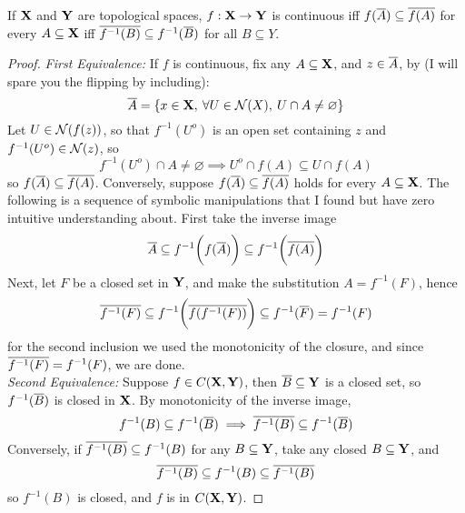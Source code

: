 \documentclass[../../main.tex]{subfiles}
\begin{document}
\begin{wts}
    If ${\mathbf{X}}$ and ${\mathbf{Y}}$ are topological spaces, $f: {\mathbf{X}}\to{\mathbf{Y}}$ is continuous iff $f(\overline{A})\subseteq\overline{f(A)}$ for every $A\subseteq {\mathbf{X}}$ iff $\overline{f^{-1}(B)}\subseteq f^{-1}(\overline{B})$ for all $B\subseteq Y$.
\end{wts}
\begin{proof}
    \emph{First Equivalence:} If $f$ is continuous, fix any $A\subseteq{\mathbf{X}}$, and $z\in \overline{A}$, by  (I will spare you the flipping by including):
    \[
    \overline{A} = \{x\in{\mathbf{X}},\: \forall U\in\mathcal{N}(X),\: U\cap A\neq\varnothing\}
    \]
    Let $U\in \mathcal{N}(f(z))$, so that $f^{-1}(U^o)$ is an open set containing $z$ and $f^{-1}(U^o)\in\mathcal{N}(z)$, so
    \[
        f^{-1}(U^o)\cap A\neq\varnothing\implies U^o\cap f(A)\subseteq U\cap f(A)
    \]
    so $f(\overline{A})\subseteq \overline{f(A)}$. Conversely, suppose $f(\overline{A})\subseteq\overline{f(A)}$ holds for every $A\subseteq{\mathbf{X}}$. The following is a sequence of symbolic manipulations that I found but have zero intuitive understanding about. First take the inverse image
    \[
        \overline{A}\subseteq f^{-1}\biggl(f(\overline{A})\biggr)\subseteq f^{-1}\biggl(\overline{f(A)}\biggr)
    \]
    Next, let $F$ be a closed set in ${\mathbf{Y}}$, and make the substitution $A = f^{-1}(F)$, hence
    \[
        \overline{f^{-1}(F)}\subseteq f^{-1}\biggl(\overline{f(f^{-1}(F))}\biggr)\subseteq f^{-1}(\overline{F})=f^{-1}(F)
    \]
    for the second inclusion we used the monotonicity of the closure, and since $\overline{f^{-1}(F)} = f^{-1}(F)$, we are done.
    \\

    \emph{Second Equivalence:} Suppose $f\in C({\mathbf{X}},{\mathbf{Y}})$, then $\overline{B}\subseteq {\mathbf{Y}}$ is a closed set, so $f^{-1}(\overline{B})$ is closed in ${\mathbf{X}}$. By monotonicity of the inverse image,
    \[
        f^{-1}(B)\subseteq f^{-1}(\overline{B})\implies \overline{f^{-1}(B)}\subseteq f^{-1}(\overline{B})
    \]
    Conversely, if $\overline{f^{-1}(B)}\subseteq f^{-1}(B)$ for any $B\subseteq {\mathbf{Y}}$, take any closed $B\subseteq {\mathbf{Y}}$, and 
    \[
        \overline{f^{-1}(B)}\subseteq f^{-1}(B)\subseteq \overline{f^{-1}(B)}
    \]
    so $f^{-1}(B)$ is closed, and $f$ is in $C({\mathbf{X}},{\mathbf{Y}})$.
\end{proof}
\newpage


\begin{wts}
\end{wts}
\end{document}
